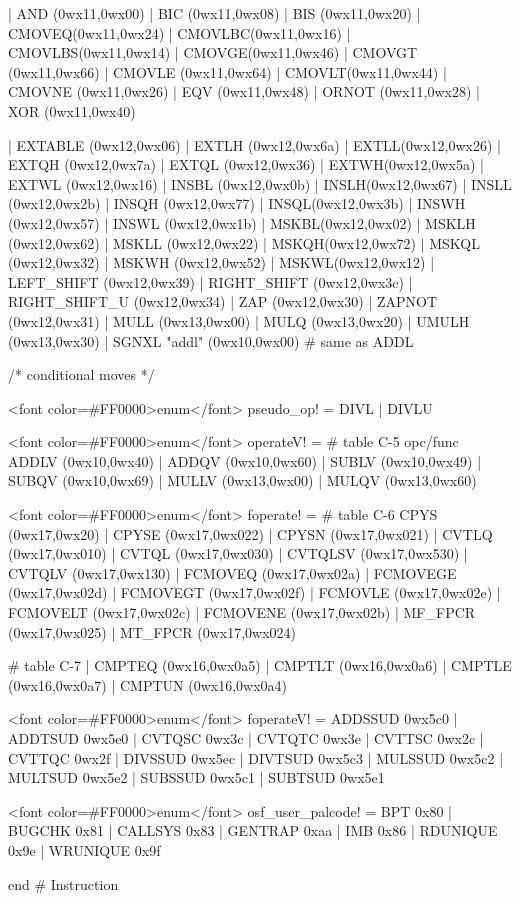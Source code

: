 \begin{SML}
     | AND   (0wx11,0wx00) | BIC    (0wx11,0wx08) | BIS    (0wx11,0wx20)
     | CMOVEQ(0wx11,0wx24) | CMOVLBC(0wx11,0wx16) | CMOVLBS(0wx11,0wx14)
     | CMOVGE(0wx11,0wx46) | CMOVGT (0wx11,0wx66) | CMOVLE (0wx11,0wx64)
     | CMOVLT(0wx11,0wx44) | CMOVNE (0wx11,0wx26) | EQV (0wx11,0wx48)
     | ORNOT (0wx11,0wx28) | XOR    (0wx11,0wx40)

     | EXTABLE (0wx12,0wx06) | EXTLH  (0wx12,0wx6a) | EXTLL(0wx12,0wx26)
     | EXTQH (0wx12,0wx7a) | EXTQL  (0wx12,0wx36) | EXTWH(0wx12,0wx5a)
     | EXTWL (0wx12,0wx16) | INSBL  (0wx12,0wx0b) | INSLH(0wx12,0wx67)
     | INSLL (0wx12,0wx2b) | INSQH  (0wx12,0wx77) | INSQL(0wx12,0wx3b)
     | INSWH (0wx12,0wx57) | INSWL  (0wx12,0wx1b) | MSKBL(0wx12,0wx02)
     | MSKLH (0wx12,0wx62) | MSKLL  (0wx12,0wx22) | MSKQH(0wx12,0wx72)
     | MSKQL (0wx12,0wx32) | MSKWH  (0wx12,0wx52) | MSKWL(0wx12,0wx12)
     | LEFT_SHIFT   (0wx12,0wx39) | RIGHT_SHIFT    (0wx12,0wx3c) | RIGHT_SHIFT_U  (0wx12,0wx34)
     | ZAP   (0wx12,0wx30) | ZAPNOT (0wx12,0wx31)
     | MULL  (0wx13,0wx00)                        | MULQ (0wx13,0wx20)
                           | UMULH  (0wx13,0wx30) 
     | SGNXL "addl" (0wx10,0wx00) #  same as ADDL 

   /* conditional moves */ 
 
   <font color=#FF0000>enum</font> pseudo_op! = DIVL | DIVLU
 
   <font color=#FF0000>enum</font> operateV! = #  table C-5 opc/func 
        ADDLV (0wx10,0wx40) | ADDQV (0wx10,0wx60)
      | SUBLV (0wx10,0wx49) | SUBQV (0wx10,0wx69) 
      | MULLV (0wx13,0wx00) | MULQV (0wx13,0wx60)
 
   <font color=#FF0000>enum</font> foperate! =   #  table C-6 
      CPYS    (0wx17,0wx20)  | CPYSE (0wx17,0wx022)    | CPYSN   (0wx17,0wx021)
    | CVTLQ   (0wx17,0wx010) | CVTQL (0wx17,0wx030)    | CVTQLSV (0wx17,0wx530)
    | CVTQLV  (0wx17,0wx130)
    | FCMOVEQ (0wx17,0wx02a) | FCMOVEGE (0wx17,0wx02d) | FCMOVEGT (0wx17,0wx02f)
    | FCMOVLE (0wx17,0wx02e) | FCMOVELT (0wx17,0wx02c) | FCMOVENE (0wx17,0wx02b)
    | MF_FPCR (0wx17,0wx025) | MT_FPCR  (0wx17,0wx024)

                         #  table C-7 
    | CMPTEQ  (0wx16,0wx0a5) | CMPTLT (0wx16,0wx0a6)   | CMPTLE  (0wx16,0wx0a7)
    | CMPTUN  (0wx16,0wx0a4)

   <font color=#FF0000>enum</font> foperateV! = 
          ADDSSUD  0wx5c0
        | ADDTSUD  0wx5e0
        | CVTQSC   0wx3c
        | CVTQTC   0wx3e
        | CVTTSC   0wx2c
        | CVTTQC   0wx2f
        | DIVSSUD  0wx5ec
        | DIVTSUD  0wx5c3
        | MULSSUD  0wx5c2
        | MULTSUD  0wx5e2
        | SUBSSUD  0wx5c1
        | SUBTSUD  0wx5e1
 
   <font color=#FF0000>enum</font> osf_user_palcode! = 
      BPT 0x80 | BUGCHK 0x81 | CALLSYS 0x83 
    | GENTRAP 0xaa | IMB 0x86 | RDUNIQUE 0x9e | WRUNIQUE 0x9f

   end #  Instruction 
\end{SML}

